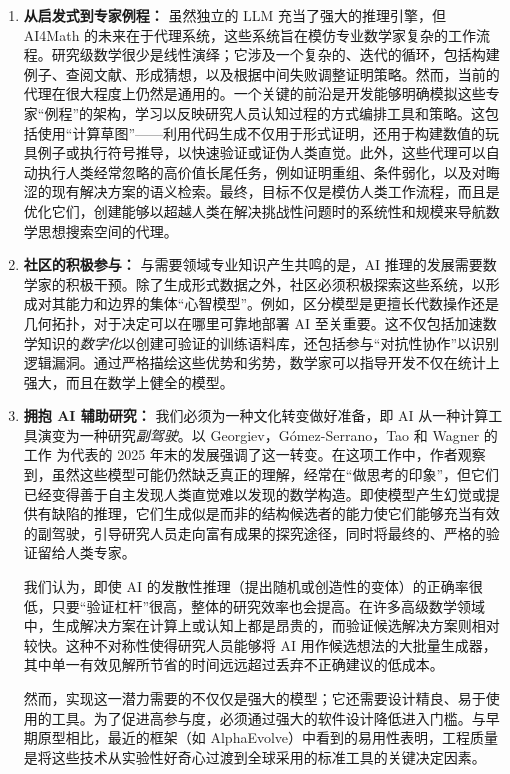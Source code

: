 \documentclass[11pt]{article}
\numberwithin{equation}{section}
\begin{document}
\begin{enumerate}
    \item \textbf{从启发式到专家例程：} 虽然独立的 LLM 充当了强大的推理引擎，但 AI4Math 的未来在于代理系统，这些系统旨在模仿专业数学家复杂的工作流程。研究级数学很少是线性演绎；它涉及一个复杂的、迭代的循环，包括构建例子、查阅文献、形成猜想，以及根据中间失败调整证明策略。然而，当前的代理在很大程度上仍然是通用的。一个关键的前沿是开发能够明确模拟这些专家“例程”的架构，学习以反映研究人员认知过程的方式编排工具和策略。这包括使用“计算草图”——利用代码生成不仅用于形式证明，还用于构建数值的玩具例子或执行符号推导，以快速验证或证伪人类直觉。此外，这些代理可以自动执行人类经常忽略的高价值长尾任务，例如证明重组、条件弱化，以及对晦涩的现有解决方案的语义检索。最终，目标不仅是模仿人类工作流程，而且是优化它们，创建能够以超越人类在解决挑战性问题时的系统性和规模来导航数学思想搜索空间的代理。

    \item \textbf{社区的积极参与：} 与需要领域专业知识产生共鸣的是，AI 推理的发展需要数学家的积极干预。除了生成形式数据之外，社区必须积极探索这些系统，以形成对其能力和边界的集体“心智模型”。例如，区分模型是更擅长代数操作还是几何拓扑，对于决定可以在哪里可靠地部署 AI 至关重要。这不仅包括加速数学知识的\textit{数字化}以创建可验证的训练语料库，还包括参与“对抗性协作”以识别逻辑漏洞。通过严格描绘这些优势和劣势，数学家可以指导开发不仅在统计上强大，而且在数学上健全的模型。
    
    \item \textbf{拥抱 AI 辅助研究：} 我们必须为一种文化转变做好准备，即 AI 从一种计算工具演变为一种研究\textit{副驾驶}。以 Georgiev，G{\'o}mez-Serrano，Tao 和 Wagner 的工作 \cite{georgiev2025mathematical} 为代表的 2025 年末的发展强调了这一转变。在这项工作中，作者观察到，虽然这些模型可能仍然缺乏真正的理解，经常在“做思考的印象”，但它们已经变得善于自主发现人类直觉难以发现的数学构造。即使模型产生幻觉或提供有缺陷的推理，它们生成似是而非的结构候选者的能力使它们能够充当有效的副驾驶，引导研究人员走向富有成果的探究途径，同时将最终的、严格的验证留给人类专家。
    
    我们认为，即使 AI 的发散性推理（提出随机或创造性的变体）的正确率很低，只要“验证杠杆”很高，整体的研究效率也会提高。在许多高级数学领域中，生成解决方案在计算上或认知上都是昂贵的，而验证候选解决方案则相对较快。这种不对称性使得研究人员能够将 AI 用作候选想法的大批量生成器，其中单一有效见解所节省的时间远远超过丢弃不正确建议的低成本。
    
    然而，实现这一潜力需要的不仅仅是强大的模型；它还需要设计精良、易于使用的工具。为了促进高参与度，必须通过强大的软件设计降低进入门槛。与早期原型相比，最近的框架（如 AlphaEvolve）中看到的易用性表明，工程质量是将这些技术从实验性好奇心过渡到全球采用的标准工具的关键决定因素。
\end{enumerate}
\end{document}
